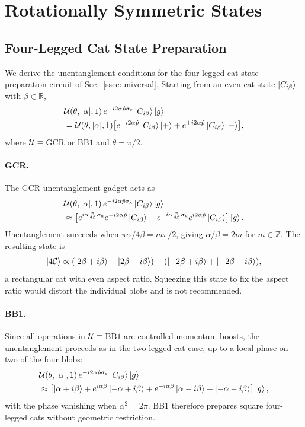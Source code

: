 \documentclass[aps,prx,showpacs,notitlepage,twocolumn,superscriptaddress,nofootinbib,preprintnumbers,floatfix,10pt, longbibliography]{revtex4-2}
\begin{document}
{\section{Rotationally Symmetric States}
\subsection{Four-Legged Cat State Preparation}\label{app:4-legged-cat}

We derive the unentanglement conditions for the four-legged cat state
preparation circuit of Sec.~\ref{ssec:universal}.  Starting from an even
cat state $\ket{C_{i\beta}}$ with $\beta\in\mathbb{R}$,
\begin{align}
  &\mathcal{U}(\theta,|\alpha|,1)\,
   e^{-i2\alpha\hat{p}\sigma_\mathrm{x}}\ket{C_{i\beta}}\ket{g}
   \nonumber\\
  &= \mathcal{U}(\theta,|\alpha|,1)
   \bigl[e^{-i2\alpha\hat{p}}\ket{C_{i\beta}}\ket{+}
        +e^{+i2\alpha\hat{p}}\ket{C_{i\beta}}\ket{-}\bigr],
\end{align}
where $\mathcal{U}\equiv\mathrm{GCR}$ or $\mathrm{BB1}$ and $\theta=\pi/2$.

\paragraph{GCR.}
The GCR unentanglement gadget acts as
\begin{align}
  &\mathcal{U}(\theta,|\alpha|,1)\,
   e^{-i2\alpha\hat{p}\sigma_\mathrm{x}}\ket{C_{i\beta}}\ket{g}
   \nonumber\\
  &\approx\bigl[e^{i\alpha\frac{\pi}{4\beta}\sigma_\mathrm{x}}
   e^{-i2\alpha\hat{p}}\ket{C_{i\beta}}
   +e^{-i\alpha\frac{\pi}{4\beta}\sigma_\mathrm{x}}
   e^{i2\alpha\hat{p}}\ket{C_{i\beta}}\bigr]\ket{g}.
\end{align}
Unentanglement succeeds when $\pi\alpha/4\beta=m\pi/2$, giving
$\alpha/\beta=2m$ for $m\in\mathbb{Z}$.  The resulting state is
\begin{equation}
  \ket{4\mathcal{C}}\propto
  (\ket{2\beta+i\beta}-\ket{2\beta-i\beta})
  -(\ket{-2\beta+i\beta}+\ket{-2\beta-i\beta}),
\end{equation}
a rectangular cat with even aspect ratio.  Squeezing this state to fix
the aspect ratio would distort the individual blobs and is not recommended.

\paragraph{BB1.}
Since all operations in $\mathcal{U}\equiv\mathrm{BB1}$ are controlled
momentum boosts, the unentanglement proceeds as in the two-legged cat case,
up to a local phase on two of the four blobs:
\begin{align}
  &\mathcal{U}(\theta,|\alpha|,1)\,
   e^{-i2\alpha\hat{p}\sigma_\mathrm{x}}\ket{C_{i\beta}}\ket{g}
   \nonumber\\
  &\approx\bigl[\ket{\alpha+i\beta}
   +e^{i\alpha\beta}\ket{-\alpha+i\beta}
   +e^{-i\alpha\beta}\ket{\alpha-i\beta}
   +\ket{-\alpha-i\beta}\bigr]\ket{g},
\end{align}
with the phase vanishing when $\alpha^2=2\pi$.  BB1 therefore prepares
square four-legged cats without geometric restriction.
}
\end{document}

